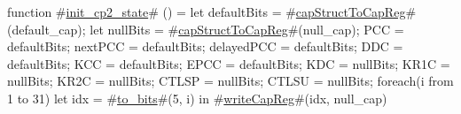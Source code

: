 function #\hyperref[zinitzycptwozystate]{init\_cp2\_state}# () = {
  let defaultBits = #\hyperref[zcapStructToCapReg]{capStructToCapReg}#(default_cap);
  let nullBits = #\hyperref[zcapStructToCapReg]{capStructToCapReg}#(null_cap);
  PCC = defaultBits;
  nextPCC = defaultBits;
  delayedPCC = defaultBits;
  DDC  = defaultBits;
  KCC  = defaultBits;
  EPCC = defaultBits;
  KDC  = nullBits;
  KR1C = nullBits;
  KR2C = nullBits;
  CTLSP = nullBits;
  CTLSU = nullBits;
  foreach(i from 1 to 31) {
    let idx = #\hyperref[ztozybits]{to\_bits}#(5, i) in
    #\hyperref[zwriteCapReg]{writeCapReg}#(idx, null_cap)
  }
}

